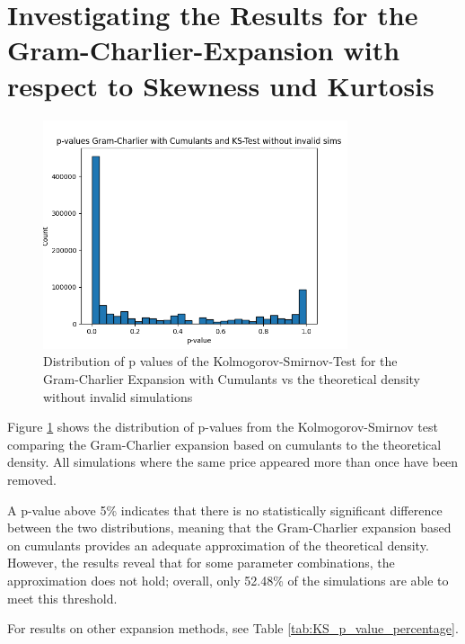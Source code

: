 \section{Investigating the Results for the Gram-Charlier-Expansion with respect to Skewness und Kurtosis}

\begin{figure}
    \centering
    \includegraphics[width=0.8\textwidth]{img/GC_cum_KS_p_value_histogram.png}
    \caption{Distribution of p values of the Kolmogorov-Smirnov-Test for the Gram-Charlier Expansion with Cumulants vs the theoretical density without invalid simulations}
    \label{fig:GC_cum_KS_p_value_histogram}
\end{figure}

Figure \ref{fig:GC_cum_KS_p_value_histogram} shows the distribution of p-values from the Kolmogorov-Smirnov test comparing the Gram-Charlier expansion based on cumulants to the theoretical density. All simulations where the same price appeared more than once have been removed.

A p-value above 5\% indicates that there is no statistically significant difference between the two distributions, meaning that the Gram-Charlier expansion based on cumulants provides an adequate approximation of the theoretical density. However, the results reveal that for some parameter combinations, the approximation does not hold; overall, only 52.48\% of the simulations are able to meet this threshold.

For results on other expansion methods, see Table \ref{tab:KS_p_value_percentage}.

